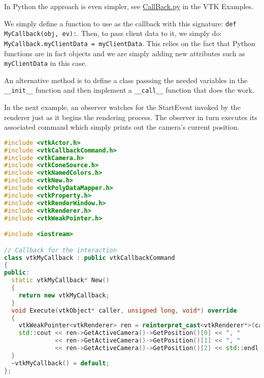 \begin{description}[leftmargin=0cm,labelindent=0cm]
\begin{description}[leftmargin=0.5cm,labelindent=0.5cm]
\item[Python]In Python the approach is even simpler, see \href{https://lorensen.github.io/VTKExamples/site/Python/Interaction/CallBack/}{CallBack.py} in the VTK Examples.

\begin{description}[leftmargin=1.0cm,labelindent=1.0cm]
\item[Using a function:] We simply define a function to use as the callback with this signature: \texttt{def MyCallback(obj, ev):}. Then, to pass client data to it, we simply do: \texttt{MyCallback.myClientData = myClientData}. This relies on the fact that Python functions are in fact objects and we are simply adding new attributes such as \texttt{myClientData} in this case.
\item[Using a class:] An alternative method is to define a class passsing the needed variables in the \texttt{\_\_init\_\_} function and then implement a \texttt{\_\_call\_\_} function that does the work.
\end{description}

\end{description}



In the next example, an observer watches for the StartEvent invoked by the renderer just as it begins the rendering process. The observer in turn executes its associated command which simply prints out the camera's current position.

\begin{lstlisting}[language=C++, caption={Cone2.cxx}, label={lst:Cone2_cxx}, escapechar=\$]
#include <vtkActor.h>
#include <vtkCallbackCommand.h>
#include <vtkCamera.h>
#include <vtkConeSource.h>
#include <vtkNamedColors.h>
#include <vtkNew.h>
#include <vtkPolyDataMapper.h>
#include <vtkProperty.h>
#include <vtkRenderWindow.h>
#include <vtkRenderer.h>
#include <vtkWeakPointer.h>

#include <iostream>

// Callback for the interaction
class vtkMyCallback : public vtkCallbackCommand
{
public:
  static vtkMyCallback* New()
  {
    return new vtkMyCallback;
  }
  void Execute(vtkObject* caller, unsigned long, void*) override
  {
    vtkWeakPointer<vtkRenderer> ren = reinterpret_cast<vtkRenderer*>(caller);
    std::cout << ren->GetActiveCamera()->GetPosition()[0] << ", "
              << ren->GetActiveCamera()->GetPosition()[1] << ", "
              << ren->GetActiveCamera()->GetPosition()[2] << std::endl;
  }
  ~vtkMyCallback() = default;
};


\end{lstlisting}
\end{description}
